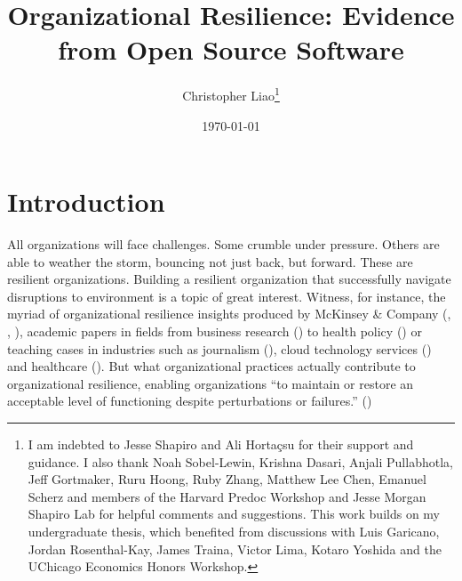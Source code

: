 \documentclass[12pt,notitlepage]{article}
\begin{document}
\begin{titlepage}
\title{Organizational Resilience: Evidence from Open Source Software}
\author{Christopher Liao\thanks{I am indebted to Jesse Shapiro and Ali Hortaçsu for their support and guidance. I also thank Noah Sobel-Lewin, Krishna Dasari, Anjali Pullabhotla, Jeff Gortmaker, Ruru Hoong, Ruby Zhang, Matthew Lee Chen, Emanuel Scherz and members of the Harvard Predoc Workshop and Jesse Morgan Shapiro Lab for helpful comments and suggestions. This work builds on my undergraduate thesis, which benefited from discussions with Luis Garicano, Jordan Rosenthal-Kay, James Traina, Victor Lima, Kotaro Yoshida and the UChicago Economics Honors Workshop.}}
\date{\today}
\maketitle

\iffalse
\begin{abstract}
\noindent Placeholder\\
\vspace{0in}\\
\noindent\textbf{Keywords:} key1, key2, key3\\

\bigskip
\end{abstract}
\fi

\setcounter{page}{0}
\thispagestyle{empty}
\end{titlepage}
\pagebreak \newpage

\section{Introduction} \label{sec:intro}

All organizations will face challenges. Some crumble under pressure. Others are able to weather the storm, bouncing not just back, but forward. 
These are resilient organizations. Building a resilient organization that successfully navigate disruptions to environment is a topic of great interest. 
Witness, for instance, the myriad of organizational resilience insights produced by McKinsey \& Company (\cite{maor_building_2022}, \cite{maor_foster_2023}, \cite{kristensen_building_2025}), academic papers in fields from business research (\cite{duchek_organizational_2020}) to health policy (\cite{barasa_what_2018}) or teaching cases in industries such as journalism (\cite{dutton_heart_2010}), cloud technology services (\cite{tang_business_2025}) and healthcare (\cite{atkinson_organizational_2023}). 
But what organizational practices actually contribute to organizational resilience, enabling organizations ``to maintain or restore an acceptable level of functioning despite perturbations or failures.'' (\cite{robert_organizational_2009})
\end{document}
